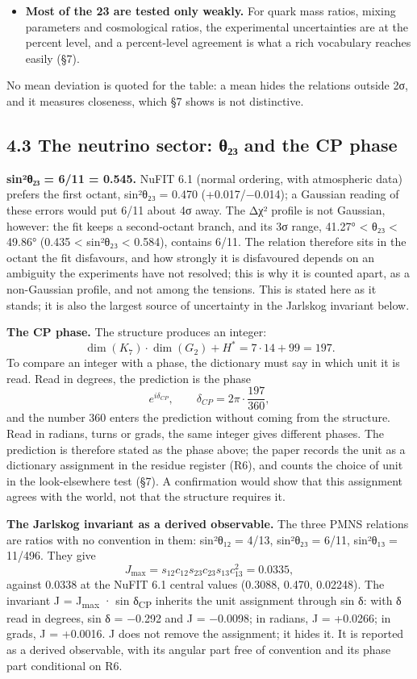 \documentclass[11pt,a4paper]{article}
\begin{document}
\begin{itemize}
\item
  \textbf{Most of the 23 are tested only weakly.} For quark mass ratios, mixing parameters and cosmological ratios, the experimental uncertainties are at the percent level, and a percent-level agreement is what a rich vocabulary reaches easily (§7).
\end{itemize}

No mean deviation is quoted for the table: a mean hides the relations outside 2σ, and it measures closeness, which §7 shows is not distinctive.

\subsection{4.3 The neutrino sector: θ₂₃ and the CP phase}\label{the-neutrino-sector-ux3b8ux2082ux2083-and-the-cp-phase}

\textbf{sin²θ₂₃ = 6/11 = 0.545.} NuFIT 6.1 (normal ordering, with atmospheric data) prefers the first octant, sin²θ₂₃ = 0.470 (+0.017/−0.014); a Gaussian reading of these errors would put 6/11 about 4σ away. The Δχ² profile is not Gaussian, however: the fit keeps a second-octant branch, and its 3σ range, 41.27° \textless{} θ₂₃ \textless{} 49.86° (0.435 \textless{} sin²θ₂₃ \textless{} 0.584), contains 6/11. The relation therefore sits in the octant the fit disfavours, and how strongly it is disfavoured depends on an ambiguity the experiments have not resolved; this is why it is counted apart, as a non-Gaussian profile, and not among the tensions. This is stated here as it stands; it is also the largest source of uncertainty in the Jarlskog invariant below.

\textbf{The CP phase.} The structure produces an integer: \[\dim(K_7) \cdot \dim(G_2) + H^* = 7 \cdot 14 + 99 = 197.\] To compare an integer with a phase, the dictionary must say in which unit it is read. Read in degrees, the prediction is the phase \[e^{i\delta_{CP}}, \qquad \delta_{CP} = 2\pi \cdot \frac{197}{360},\] and the number 360 enters the prediction without coming from the structure. Read in radians, turns or grads, the same integer gives different phases. The prediction is therefore stated as the phase above; the paper records the unit as a dictionary assignment in the residue register (R6), and counts the choice of unit in the look-elsewhere test (§7). A confirmation would show that this assignment agrees with the world, not that the structure requires it.

\textbf{The Jarlskog invariant as a derived observable.} The three PMNS relations are ratios with no convention in them: sin²θ₁₂ = 4/13, sin²θ₂₃ = 6/11, sin²θ₁₃ = 11/496. They give \[J_{\max} = s_{12}c_{12}s_{23}c_{23}s_{13}c_{13}^2 = 0.0335,\] against 0.0338 at the NuFIT 6.1 central values (0.3088, 0.470, 0.02248). The invariant J = J\textsubscript{max} · sin δ\textsubscript{CP} inherits the unit assignment through sin δ: with δ read in degrees, sin δ = −0.292 and J = −0.0098; in radians, J = +0.0266; in grads, J = +0.0016. J does not remove the assignment; it hides it. It is reported as a derived observable, with its angular part free of convention and its phase part conditional on R6.
\end{document}
